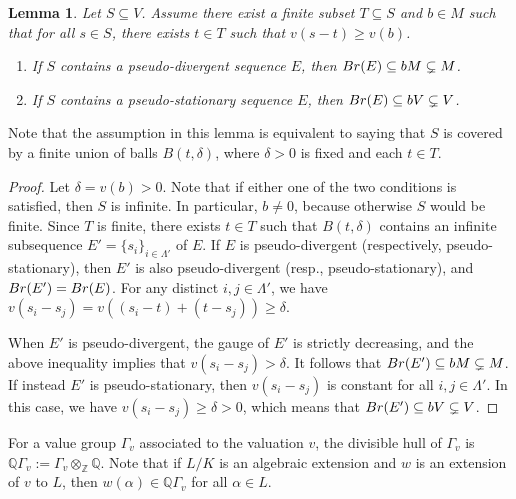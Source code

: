 \documentclass{article}
\newtheorem{Lem}[equation]{Lemma}
\theoremstyle{definition}\newtheorem{Def}[equation]{Definition}
\theoremstyle{definition}\newtheorem{Ques}[equation]{Question}
\theoremstyle{definition}\newtheorem{Conj}[equation]{Conjecture}
\theoremstyle{definition}\newtheorem{Not}[equation]{Notation}
\newcommand{\Q}{\mathbb{Q}}
\newcommand{\Z}{\mathbb{Z}}
\newcommand{\Br}{\textnormal{Br}}
\numberwithin{equation}{section}
\begin{document}
\begin{Lem}\label{delta balls lem}
Let $S \subseteq V$. Assume there exist a finite subset $T \subseteq S$ and $b \in M$ such that
for all $s \in S$, there exists $t \in T$ such that $v(s - t) \geq v(b)$.
\begin{enumerate}[(1)]
\item If $S$ contains a pseudo-divergent sequence $E$, then $\Br(E) \subseteq bM \subsetneq M$.
\item If $S$ contains a pseudo-stationary sequence $E$, then $\Br(E) \subseteq bV \subsetneq V$.
\end{enumerate}
\end{Lem}
Note that the assumption in this lemma is equivalent to saying that $S$ is covered by a finite union of balls $B(t,\delta)$, where $\delta > 0$ is fixed and each $t\in T$. 
\begin{proof}
Let $\delta = v(b) > 0$. Note that if either one of the two conditions is satisfied, then $S$ is infinite. In particular, $b\not=0$, because otherwise $S$ would be finite. Since $T$ is finite, there exists $t \in T$ such that $B(t,\delta)$ contains an infinite subsequence $E' = \{s_i\}_{i \in \Lambda'}$ of $E$. If $E$ is pseudo-divergent (respectively, pseudo-stationary), then $E'$ is also pseudo-divergent (resp., pseudo-stationary), and $\Br(E') = \Br(E)$. For any distinct $i, j \in \Lambda'$, we have $v(s_i - s_j) = v((s_i - t) + (t - s_j)) \geq \delta$.

When $E'$ is pseudo-divergent, the gauge of $E'$ is strictly decreasing, and the above inequality implies that $v(s_i - s_j) > \delta$. It follows that $\Br(E') \subseteq bM \subsetneq M$. If instead $E'$ is pseudo-stationary, then $v(s_i-s_j)$ is constant for all $i, j \in \Lambda'$. In this case, we have $v(s_i-s_j) \geq \delta > 0$, which means that $\Br(E') \subseteq bV \subsetneq V$.
\end{proof}

For a value group $\Gamma_v$ associated to the valuation $v$, the divisible hull of $\Gamma_v$ is $\Q\Gamma_v:=\Gamma_v \otimes_\Z \Q$. Note that if $L/K$ is an algebraic extension and $w$ is an extension of $v$ to $L$, then $w(\alpha) \in \Q\Gamma_v$ for all $\alpha \in L$.
\end{document}
